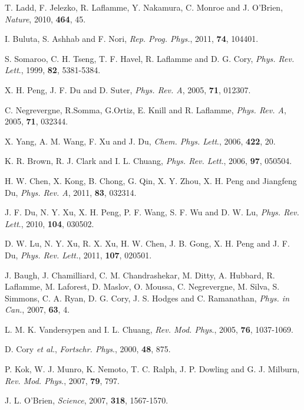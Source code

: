 \documentclass[8.5pt,twoside,twocolumn]{article}
\begin{document}
\begin{thebibliography}{99}
T. Ladd, F. Jelezko, R. Laflamme, Y. Nakamura, C. Monroe and J. O'Brien, \emph{Nature}, 2010, \textbf{464}, 45.

I. Buluta, S. Ashhab and F. Nori, \emph{Rep. Prog. Phys.}, 2011, \textbf{74}, 104401.

S. Somaroo, C. H. Tseng, T. F. Havel, R. Laflamme and D. G. Cory, \emph{Phys. Rev. Lett}., 1999, \textbf{82}, 5381-5384.

X. H. Peng, J. F. Du and D. Suter, \emph{Phys. Rev. A}, 2005, \textbf{71}, 012307.

C. Negrevergne, R.Somma, G.Ortiz, E. Knill and R. Laflamme, \emph{Phys. Rev. A}, 2005, \textbf{71}, 032344.

X. Yang, A. M. Wang, F. Xu and J. Du, \emph{Chem. Phys. Lett}., 2006, \textbf{422}, 20.

K. R. Brown, R. J. Clark and I. L. Chuang, \emph{Phys. Rev. Lett}., 2006, \textbf{97}, 050504.

H. W. Chen, X. Kong, B. Chong, G. Qin, X. Y. Zhou, X. H. Peng and Jiangfeng Du, \emph{Phys. Rev. A}, 2011, \textbf{83}, 032314.

J. F. Du, N. Y. Xu, X. H. Peng, P. F. Wang, S. F. Wu and D. W. Lu, \emph{Phys. Rev. Lett}., 2010, \textbf{104}, 030502.

D. W. Lu, N. Y. Xu, R. X. Xu, H. W. Chen, J. B. Gong, X. H. Peng and J. F. Du, \emph{Phys. Rev. Lett.}, 2011, \textbf{107}, 020501.

J. Baugh, J. Chamilliard, C. M. Chandrashekar, M. Ditty, A. Hubbard, R. Laflamme, M. Laforest, D. Maslov, O. Moussa, C. Negrevergne, M. Silva, S. Simmons, C. A. Ryan, D. G. Cory, J. S. Hodges and C. Ramanathan, \emph{Phys. in Can.}, 2007, \textbf{63}, 4.

L. M. K. Vandersypen and I. L. Chuang, \emph{Rev. Mod. Phys}., 2005, \textbf{76}, 1037-1069.

D. Cory \emph{et al.}, \emph{Fortschr. Phys}., 2000, \textbf{48}, 875.

P. Kok, W. J. Munro, K. Nemoto, T. C. Ralph, J. P. Dowling and G. J. Milburn, \emph{Rev. Mod. Phys}., 2007, \textbf{79}, 797.

J. L. O'Brien, \emph{Science}, 2007,  \textbf{318}, 1567-1570.


\end{thebibliography}
\end{document}
